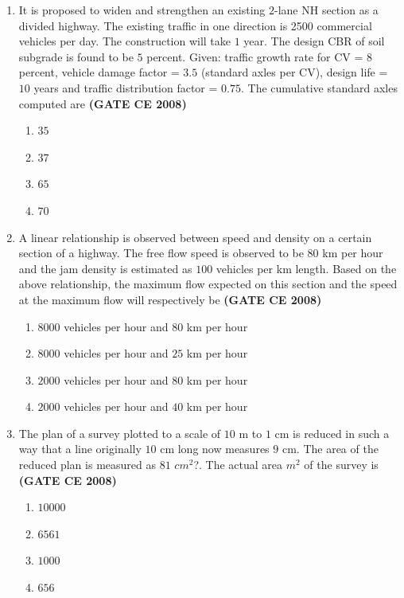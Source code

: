 \documentclass[journal]{IEEEtran}
\begin{document}
\begin{enumerate}
\item It is proposed to widen and strengthen an existing $2$-lane NH section as a divided highway. The existing traffic in one direction is 2500 commercial vehicles  per day. The construction will take $1$ year. The design CBR of soil subgrade is found to be $5$ percent. Given: traffic growth rate for CV = $8$ percent, vehicle damage factor = $3.5$ (standard axles per CV), design life = $10$ years and traffic distribution factor = $0.75$. The cumulative standard axles  computed are \textbf{(GATE CE 2008)}
\begin{multicols}{2}
\begin{enumerate}
\item $35$
\item $37$
\item $65$
\item $70$
\end{enumerate}  
\end{multicols}

\item A linear relationship is observed between speed and density on a certain section of a highway. The free flow speed is observed to be $80$ km per hour and the jam density is estimated as $100$ vehicles per km length. Based on the above relationship, the maximum flow expected on this section and the speed at the maximum flow will respectively be \textbf{(GATE CE 2008)}
\begin{multicols}{2}
\begin{enumerate}
\item $8000$ vehicles per hour and $80$ km per hour
\item $8000$ vehicles per hour and $25$ km per hour
\item $2000$ vehicles per hour and $80$ km per hour
\item $2000$ vehicles per hour and $40$ km per hour
\end{enumerate}  
\end{multicols}

\item The plan of a survey plotted to a scale of $10$ m to $1$ cm is reduced in such a way that a line originally $10$ cm long now measures $9$ cm. The area of the reduced plan is measured as $81$ $cm^{2}$?. The actual area $m^{2}$ of the survey is \textbf{(GATE CE 2008)}
\begin{multicols}{2}
\begin{enumerate}
\item $10000$
\item $6561$
\item $1000$
\item $656$ 
\end{enumerate}  
\end{multicols}


\end{enumerate}
\end{document}
